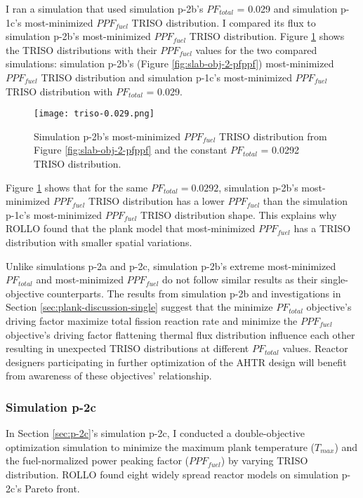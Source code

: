 I ran a simulation that used simulation p-2b's $PF_{total}$ = 0.029 and 
simulation p-1c's most-minimized $PPF_{fuel}$ TRISO distribution. 
I compared its flux to simulation p-2b's most-minimized $PPF_{fuel}$ TRISO 
distribution. 
Figure \ref{fig:triso-0.0292} shows the TRISO distributions with 
their $PPF_{fuel}$ values for the two compared 
simulations: simulation p-2b's (Figure \ref{fig:slab-obj-2-pfppf}) most-minimized 
$PPF_{fuel}$ TRISO distribution and simulation p-1c's most-minimized $PPF_{fuel}$ 
TRISO distribution with $PF_{total}$ = 0.029. 
\begin{figure}[htbp!]
    \centering
    \texttt{[image: triso-0.029.png]} 
    \caption{Simulation p-2b's most-minimized $PPF_{fuel}$ TRISO distribution 
    from Figure \ref{fig:slab-obj-2-pfppf} and the constant $PF_{total}$ = 0.0292
    TRISO distribution.}
    \label{fig:triso-0.0292}
\end{figure}
Figure \ref{fig:triso-0.0292} shows that for the same $PF_{total}=0.0292$, 
simulation p-2b's most-minimized $PPF_{fuel}$ TRISO distribution has a lower 
$PPF_{fuel}$ than the simulation p-1c's most-minimized $PPF_{fuel}$ TRISO distribution 
shape. 
This explains why \gls{ROLLO} found that the plank model that most-minimized 
$PPF_{fuel}$ has a TRISO distribution with smaller spatial variations. 

Unlike simulations p-2a and p-2c, simulation p-2b's extreme most-minimized $PF_{total}$ 
and most-minimized $PPF_{fuel}$ do not follow similar results as their single-objective 
counterparts.  
The results from simulation p-2b and investigations in Section 
\ref{sec:plank-discussion-single} suggest that the minimize $PF_{total}$ 
objective's driving factor maximize total fission reaction rate and 
minimize the $PPF_{fuel}$ objective's driving factor flattening thermal flux 
distribution influence each other resulting in unexpected TRISO distributions at 
different $PF_{total}$ values. 
Reactor designers participating in further optimization of the \gls{AHTR} design 
will benefit from awareness of these objectives' relationship. 

\subsubsection{Simulation p-2c}
In Section \ref{sec:p-2c}'s simulation p-2c, I conducted a double-objective 
optimization simulation to minimize the maximum plank temperature ($T_{max}$) and the 
fuel-normalized power peaking factor ($PPF_{fuel}$) by varying TRISO distribution. 
\gls{ROLLO} found eight widely spread reactor models on simulation p-2c's Pareto 
front. 

